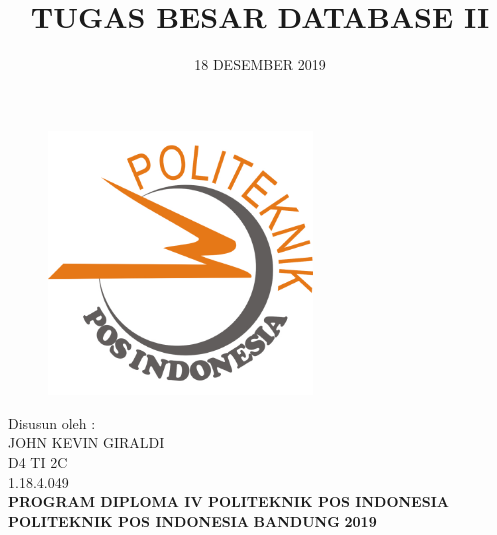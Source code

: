 \documentclass[a4paper, 12pt]{article}
\begin{document}
\title{\huge\textbf{TUGAS BESAR DATABASE II}}
\date{18 DESEMBER 2019}

\maketitle


\begin{figure}[!ht]
\begin{center}
\includegraphics[width = 7cm, height = 7cm]{figure/P.jpg}
\end{center}
\end{figure}

\begin{center}
Disusun oleh :\\
JOHN KEVIN GIRALDI\\
D4 TI 2C\\
1.18.4.049\\
\vspace{1cm}
\textbf{PROGRAM DIPLOMA IV POLITEKNIK POS INDONESIA} \linebreak
\textbf{POLITEKNIK POS INDONESIA} \linebreak
\textbf{BANDUNG}\linebreak
\textbf{2019}
\end{center}
\end{document}
